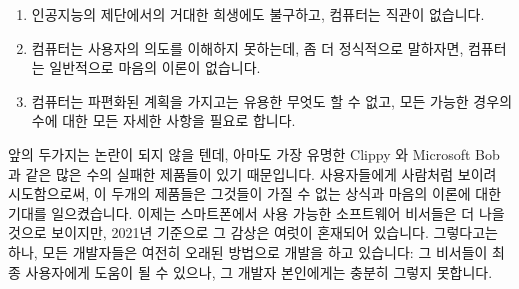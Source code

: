 \begin{enumerate}
\item	인공지능의 제단에서의 거대한 희생에도 불구하고, 컴퓨터는 직관이
	없습니다.
\item	컴퓨터는 사용자의 의도를 이해하지 못하는데, 좀 더 정식적으로 말하자면,
	컴퓨터는 일반적으로 마음의 이론이 없습니다.
\item	컴퓨터는 파편화된 계획을 가지고는 유용한 무엇도 할 수 없고, 모든 가능한
	경우의 수에 대한 모든 자세한 사항을 필요로 합니다.

\end{enumerate}

앞의 두가지는 논란이 되지 않을 텐데, 아마도 가장 유명한 Clippy 와 Microsoft Bob
과 같은 많은 수의 실패한 제품들이 있기 때문입니다.
사용자들에게 사람처럼 보이려 시도함으로써, 이 두개의 제품들은 그것들이 가질 수
없는 상식과 마음의 이론에 대한 기대를 일으켰습니다.
이제는 스마트폰에서 사용 가능한 소프트웨어 비서들은 더 나을 것으로 보이지만,
2021년 기준으로 그 감상은 여럿이 혼재되어 있습니다.
그렇다고는 하나, 모든 개발자들은 여전히 오래된 방법으로 개발을 하고 있습니다:
그 비서들이 최종 사용자에게 도움이 될 수 있으나, 그 개발자 본인에게는 충분히
그렇지 못합니다.

